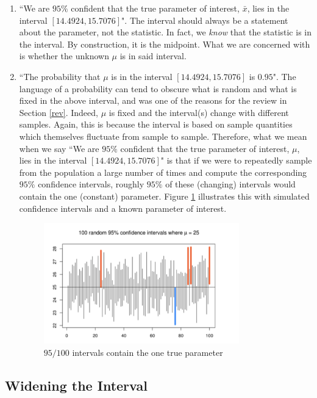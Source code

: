 \documentclass[11pt]{article}
\begin{document}
\begin{enumerate}
\item ``We are $95\%$ confident that the true parameter of interest, $\bar{x}$, lies in the interval $[14.4924, 15.7076]$".  The interval should always be a statement about the parameter, not the statistic.  In fact, we \textit{know} that the statistic is in the interval.  By construction, it is the midpoint.  What we are concerned with is whether the unknown $\mu$ is in said interval.  
\item ``The probability that $\mu$ is in the interval $[14.4924, 15.7076]$ is $0.95$".  The language of a probability can tend to obscure what is random and what is fixed in the above interval, and was one of the reasons for the review in Section \ref{rev}.  Indeed, $\mu$ is fixed and the interval(s) change with different samples.  Again, this is because the interval is based on sample quantities which themselves fluctuate from sample to sample.  Therefore, what we mean when we say ``We are $95\%$ confident that the true parameter of interest, $\mu$, lies in the interval $[14.4924, 15.7076]$" is that if we were to repeatedly sample from the population a large number of times and compute the corresponding $95\%$ confidence intervals, roughly $95\%$ of these (changing) intervals would contain the one (constant) parameter.  Figure \ref{ci} illustrates this with simulated confidence intervals and a known parameter of interest.  

\begin{figure}[h]
\centering
\includegraphics[width=0.8\textwidth]{ci.png}
\caption{$95/100$ intervals contain the one true parameter}\label{ci}
\end{figure}

\end{enumerate}

\subsection{Widening the Interval} 
\end{document}
